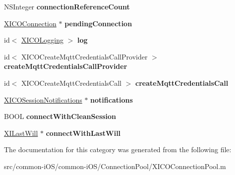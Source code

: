 \begin{DoxyCompactItemize}
N\+S\+Integer {\bfseries connection\+Reference\+Count}
\item 
\hypertarget{category_x_i_c_o_connection_pool_07_08_a4a16ad790cb5d00a4326be0aa5dfe984}{}\label{category_x_i_c_o_connection_pool_07_08_a4a16ad790cb5d00a4326be0aa5dfe984} 
\hyperlink{interface_x_i_c_o_connection}{X\+I\+C\+O\+Connection} $\ast$ {\bfseries pending\+Connection}
\item 
\hypertarget{category_x_i_c_o_connection_pool_07_08_a9f3ba869ad9394d32cfe91a48aa2259c}{}\label{category_x_i_c_o_connection_pool_07_08_a9f3ba869ad9394d32cfe91a48aa2259c} 
id$<$ \hyperlink{protocol_x_i_c_o_logging-p}{X\+I\+C\+O\+Logging} $>$ {\bfseries log}
\item 
\hypertarget{category_x_i_c_o_connection_pool_07_08_a90de70b82f8129e3b11cf87576b552f0}{}\label{category_x_i_c_o_connection_pool_07_08_a90de70b82f8129e3b11cf87576b552f0} 
id$<$ X\+I\+C\+O\+Create\+Mqtt\+Credentials\+Call\+Provider $>$ {\bfseries create\+Mqtt\+Credentials\+Call\+Provider}
\item 
\hypertarget{category_x_i_c_o_connection_pool_07_08_afa582780f832c87aa21e08debcdb1232}{}\label{category_x_i_c_o_connection_pool_07_08_afa582780f832c87aa21e08debcdb1232} 
id$<$ X\+I\+C\+O\+Create\+Mqtt\+Credentials\+Call $>$ {\bfseries create\+Mqtt\+Credentials\+Call}
\item 
\hypertarget{category_x_i_c_o_connection_pool_07_08_a113b18d1cba4073043f05ab27cd72cdd}{}\label{category_x_i_c_o_connection_pool_07_08_a113b18d1cba4073043f05ab27cd72cdd} 
\hyperlink{interface_x_i_c_o_session_notifications}{X\+I\+C\+O\+Session\+Notifications} $\ast$ {\bfseries notifications}
\item 
\hypertarget{category_x_i_c_o_connection_pool_07_08_a162ef78b1109273fe496a4ca37aad785}{}\label{category_x_i_c_o_connection_pool_07_08_a162ef78b1109273fe496a4ca37aad785} 
B\+O\+OL {\bfseries connect\+With\+Clean\+Session}
\item 
\hypertarget{category_x_i_c_o_connection_pool_07_08_a889281e3b04122586ec4f68afdcefac7}{}\label{category_x_i_c_o_connection_pool_07_08_a889281e3b04122586ec4f68afdcefac7} 
\hyperlink{class_x_i_last_will}{X\+I\+Last\+Will} $\ast$ {\bfseries connect\+With\+Last\+Will}
\end{DoxyCompactItemize}


The documentation for this category was generated from the following file\+:\begin{DoxyCompactItemize}
\item 
src/common-\/i\+O\+S/common-\/i\+O\+S/\+Connection\+Pool/X\+I\+C\+O\+Connection\+Pool.\+m\end{DoxyCompactItemize}
